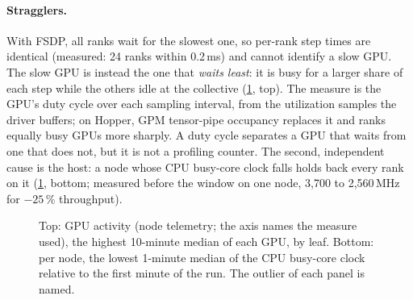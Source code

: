 \paragraph{Stragglers.} With FSDP, all ranks wait for the slowest one, so per-rank step times are identical
(measured: 24 ranks within 0.2\,ms) and cannot identify a slow GPU. The slow GPU is instead the one that
\emph{waits least}: it is busy for a larger share of each step while the others idle at the collective
(\cref{fig:stragglers}, top). The measure is the GPU's duty cycle over each sampling interval, from the
utilization samples the driver buffers; on Hopper, GPM tensor-pipe occupancy replaces
it and ranks equally busy GPUs more sharply. A duty cycle separates a GPU that waits from one that does
not, but it is not a profiling counter. The second, independent cause
is the host: a node whose CPU busy-core clock falls holds back every rank on it (\cref{fig:stragglers},
bottom; measured before the window on one node, 3{,}700 to 2{,}560\,MHz for
\(-25\,\%\) throughput).

\begin{figure}[h]
  \centering{}
  \caption{Top: GPU activity (node telemetry; the axis names the measure used),
    the highest 10-minute median of each GPU, by leaf. Bottom: per node, the lowest 1-minute median of the
    CPU busy-core clock relative to the first minute of the run. The outlier of each panel is named.}
  \label{fig:stragglers}
\end{figure}

